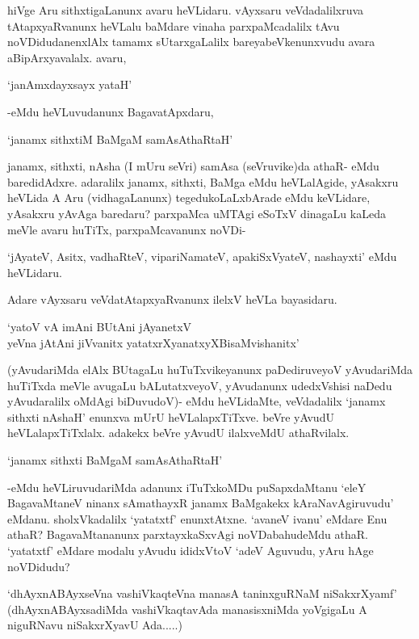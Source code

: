 hiVge Aru sithxtigaLanunx avaru heVLidaru. vAyxsaru veVdadalilxruva tAtapxyaRvanunx heVLalu baMdare vinaha parxpaMcadalilx tAvu noVDidudanenxlAlx tamamx sUtarxgaLalilx bareyabeVkenunxvudu avara aBipArxyavalalx. avaru,


\begin{shloka}
`janAmxdayxsayx yataH'
\end{shloka}

-eMdu heVLuvudanunx BagavatApxdaru,

\begin{shloka}
`janamx sithxtiM BaMgaM samAsAthaRtaH'
\end{shloka}

janamx, sithxti, nAsha (I mUru seVri) samAsa (seVruvike)da athaR- eMdu baredidAdxre. adaralilx janamx, sithxti, BaMga eMdu heVLalAgide, yAsakxru heVLida A Aru (vidhagaLanunx) tegedukoLaLxbArade eMdu keVLidare, yAsakxru yAvAga baredaru? parxpaMca uMTAgi eSoTxV dinagaLu kaLeda meVle avaru huTiTx, parxpaMcavanunx noVDi-

`jAyateV, Asitx, vadhaRteV, vipariNamateV, apakiSxVyateV, nashayxti' eMdu heVLidaru.

Adare vAyxsaru veVdatAtapxyaRvanunx ilelxV heVLa bayasidaru.

\begin{shloka}
`yatoV vA imAni BUtAni jAyanetxV\\
yeVna jAtAni jiVvanitx yatatxrXyanatxyXBisaMvishanitx'
\end{shloka}

(yAvudariMda elAlx BUtagaLu huTuTxvikeyanunx paDediruveyoV yAvu\-da\-riM\-da huTiTxda meVle avugaLu bALutatxveyoV, yAvudanunx udedxVshisi naDedu yAvudaralilx oMdAgi biDuvudoV)- eMdu heVLidaMte, veVdadalilx `janamx sithxti nAshaH' enunxva mUrU heVLalapxTiTxve. beVre yAvudU heVLalapxTiTxlalx. adakekx beVre yAvudU ilalxveMdU athaRvilalx.

\begin{shloka}
`janamx sithxti BaMgaM samAsAthaRtaH'
\end{shloka}

-eMdu heVLiruvudariMda adanunx iTuTxkoMDu puSapxdaMtanu `eleY BagavaMtaneV ninanx sAmathayxR janamx BaMgakekx kAraNavAgiruvudu' eMdanu. sholxVkadalilx `yatatxtf' enunxtAtxne. `avaneV ivanu' eMdare Enu athaR? BagavaMtananunx parxtayxkaSxvAgi noVDabahudeMdu athaR. `yatatxtf' eMdare modalu yAvudu ididxVtoV `adeV Aguvudu, yAru hAge noVDidudu?

`dhAyxnABAyxseVna vashiVkaqteVna manasA taninxguRNaM niSakxrXyamf' (dhAyxnABAyxsadiMda vashiVkaqtavAda manasisxniMda yoVgigaLu A niguRNavu niSakxrXyavU Ada.....)

